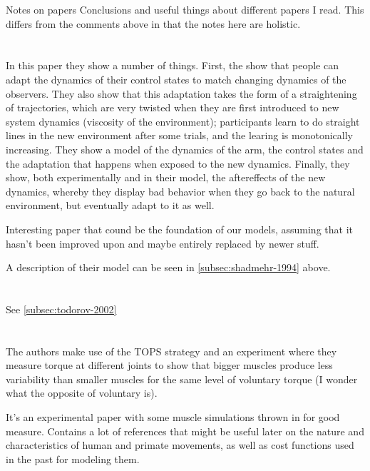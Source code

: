 \documentclass{report}
\begin{document}
\begin{chapter}{Notes on papers}
Conclusions and useful things about different papers I read. This differs from the comments above in that the notes here are holistic.

\section{\cite{Shadmehr_Adaptive_1994}}
In this paper they show a number of things. First, the show that people can adapt the dynamics of their control states to match changing dynamics of the observers. They also show that this adaptation takes the form of a straightening of trajectories, which are very twisted when they are first introduced to new system dynamics (viscosity of the environment); participants learn to do straight lines in the new environment after some trials, and the learing is monotonically increasing. They show a model of the dynamics of the arm, the control states and the adaptation that happens when exposed to the new dynamics. Finally, they show, both experimentally and in their model, the aftereffects of the new dynamics, whereby they display bad behavior when they go back to the natural environment, but eventually adapt to it as well.

Interesting paper that cound be the foundation of our models, assuming that it hasn't been improved upon and maybe entirely replaced by newer stuff.

A description of their model can be seen in \ref{subsec:shadmehr-1994} above.

\section{\cite{Todorov_Optimal_2002}}
See \ref{subsec:todorov-2002}

\section{\cite{deC.Hamilton_scaling_2004}}
The authors make use of the TOPS strategy \citep{Harris_Signaldependent_1998} and an experiment where they measure torque at different joints to show that bigger muscles produce less variability than smaller muscles for the same level of voluntary torque (I wonder what the opposite of voluntary is).

It's an experimental paper with some muscle simulations thrown in for good measure. Contains a lot of references that might be useful later on the nature and characteristics of human and primate movements, as well as cost functions used in the past for modeling them.


\end{chapter}
\end{document}
